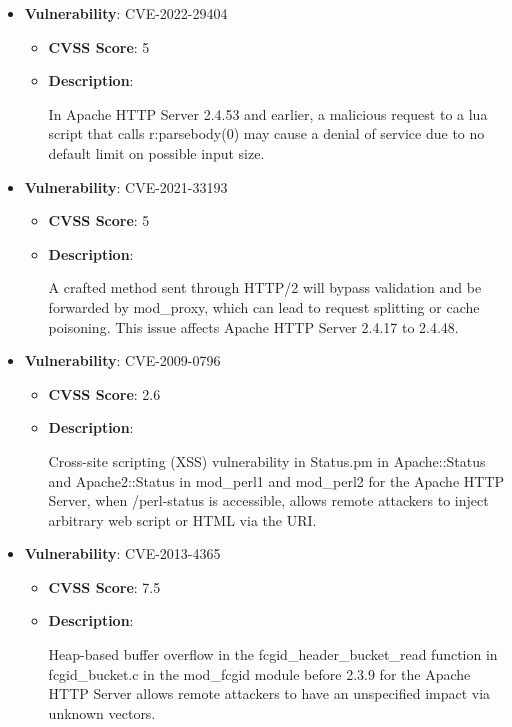 \documentclass{article}
\begin{document}
\begin{itemize}
        \item \textbf{Vulnerability}: CVE-2022-29404
        \begin{itemize}
            \item \textbf{CVSS Score}:  5 
            \item \textbf{Description}:
            \parbox[t]{0.9\linewidth}{
                \ttfamily In Apache HTTP Server 2.4.53 and earlier, a malicious request to a lua script that calls r:parsebody(0) may cause a denial of service due to no default limit on possible input size.
            }
        \end{itemize}
    
        \item \textbf{Vulnerability}: CVE-2021-33193
        \begin{itemize}
            \item \textbf{CVSS Score}:  5 
            \item \textbf{Description}:
            \parbox[t]{0.9\linewidth}{
                \ttfamily A crafted method sent through HTTP/2 will bypass validation and be forwarded by mod\_proxy, which can lead to request splitting or cache poisoning. This issue affects Apache HTTP Server 2.4.17 to 2.4.48.
            }
        \end{itemize}
    
        \item \textbf{Vulnerability}: CVE-2009-0796
        \begin{itemize}
            \item \textbf{CVSS Score}:  2.6 
            \item \textbf{Description}:
            \parbox[t]{0.9\linewidth}{
                \ttfamily Cross-site scripting (XSS) vulnerability in Status.pm in Apache::Status and Apache2::Status in mod\_perl1 and mod\_perl2 for the Apache HTTP Server, when /perl-status is accessible, allows remote attackers to inject arbitrary web script or HTML via the URI.
            }
        \end{itemize}
    
        \item \textbf{Vulnerability}: CVE-2013-4365
        \begin{itemize}
            \item \textbf{CVSS Score}:  7.5 
            \item \textbf{Description}:
            \parbox[t]{0.9\linewidth}{
                \ttfamily Heap-based buffer overflow in the fcgid\_header\_bucket\_read function in fcgid\_bucket.c in the mod\_fcgid module before 2.3.9 for the Apache HTTP Server allows remote attackers to have an unspecified impact via unknown vectors.
            }
        \end{itemize}
    

\end{itemize}
\end{document}
